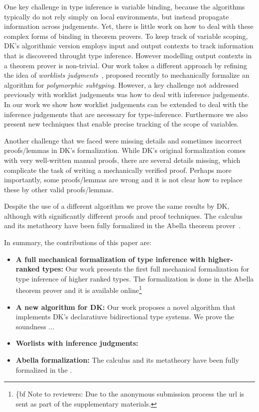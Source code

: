 One key challenge in type inference is variable binding,
because the algorithms typically do not rely simply on local
environments, but instead propagate information across judgements.
Yet, there is little work on how to deal with these complex forms of
binding in theorem provers. To keep track of variable scoping, DK's
algorithmic version employs input and output contexts to track
information that is discovered throught type inference. However
modelling output contexts in a theorem prover is non-trivial. Our
work takes a different approach by refining the idea of
\emph{worklists judgments}~\cite{}, proposed recently to mechanically
formalize an algorithm for \emph{polymorphic subtyping}.
However, a key challenge not addressed previously with
worklist judgements was how to deal with inference judgements.
In our work we show how worklist judgements can be extended to
deal with the inference judgements that are necessary for type-inference.
Furthermore we also present new techniques that enable precise tracking
of the scope of variables.


Another challenge that we faced were missing details and sometimes
incorrect proofs/lemmas in DK's formalization. While DK's original
formalization comes with very well-written manual proofs, there are
several details missing, which complicate the task of writing a
mechanically verified proof. Perhaps more importantly, some
proofs/lemmas are wrong and it is not clear how to replace these by
other valid proofs/lemmas.


Despite the use of a different algorithm we prove the
same results by DK, although with significantly different proofs and
proof techniques. The calculus and its metatheory
have been fully formalized in the Abella theorem prover~\cite{AbellaDesc}. %

In summary, the contributions of this paper are:

\begin{itemize}

\item {\bf A full mechanical formalization of type inference with
  higher-ranked types:} Our work presents the first full mechanical formalization
  for type inference of higher ranked types. The formalization is done in the
  Abella theorem prover\cite{AbellaDesc} and it is available
  online\footnote{{\{bf Note to reviewers:} Due to the anonymous submission process
  the url is sent as part of the supplementary materials.}

\item {\bf A new algorithm for DK:} Our work proposes a novel algorithm that implements
  DK's declaratiuve bidirectional type systems. We prove the soundness ...

\item {\bf Worlists with inference judgments:}

\item {\bf Abella formalization:} The calculus and its metatheory
have been fully formalized in the .

\end{itemize}
